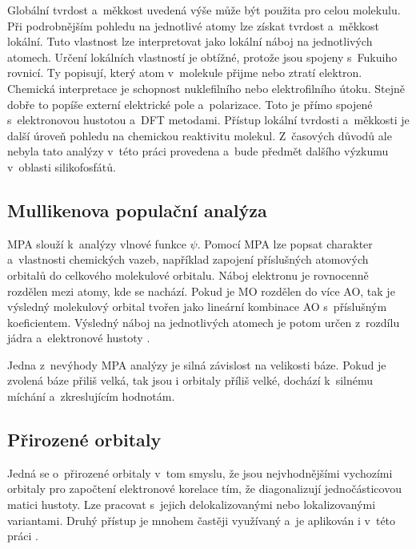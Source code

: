 \documentclass[
digital, %
table,   %
nolof,     %
nolot,     %
oneside,
]{fithesis3}
\begin{document}
Globální tvrdost a~měkkost uvedená výše může být použita pro celou molekulu. Při podrobnějším pohledu na jednotlivé atomy lze získat tvrdost a~měkkost lokální. Tuto vlastnost lze interpretovat jako lokální náboj na jednotlivých atomech. Určení lokálních vlastností je obtížné, protože jsou spojeny s~Fukuiho rovnicí. Ty popisují, který atom v~molekule přijme nebo ztratí elektron. Chemická interpretace je schopnost nuklefilního nebo elektrofilního útoku. Stejně dobře to popíše externí elektrické pole a~polarizace. Toto je přímo spojené s~elektronovou hustotou a~DFT metodami. Přístup lokální tvrdosti a~měkkosti je další úroveň pohledu na chemickou reaktivitu molekul. Z~časových důvodů ale nebyla tato analýzy v~této práci provedena a~bude předmět dalšího výzkumu v~oblasti silikofosfátů.

\subsection{Mullikenova populační analýza}
MPA slouží k~analýzy vlnové funkce $\psi$. Pomocí MPA lze popsat charakter a~vlastnosti chemických vazeb, například zapojení příslušných atomových orbitalů do celkového molekulové orbitalu. Náboj elektronu je rovnocenně rozdělen mezi atomy, kde se nachází. Pokud je MO rozdělen do více AO, tak je výsledný molekulový orbital tvořen jako lineární kombinace AO s~příslušným koeficientem. Výsledný náboj na jednotlivých atomech je potom určen z~rozdílu jádra a~elektronové hustoty \cite{lowe2011quantum}.

Jedna z~nevýhody MPA analýzy je silná závislost na velikosti báze. Pokud je zvolená báze přiliš velká, tak jsou i orbitaly příliš velké, dochází k~silnému míchání a~zkreslujícím hodnotám.

\subsection{Přirozené orbitaly}
Jedná se o~přirozené orbitaly v~tom smyslu, že jsou nejvhodnějšími vychozími orbitaly pro započtení elektronové korelace tím, že diagonalizují jednočásticovou matici hustoty. Lze pracovat s~jejich delokalizovanými nebo lokalizovanými variantami. Druhý přístup je mnohem častěji využívaný a~je aplikován i v~této práci \cite{weinhold2005valency}.
\end{document}
